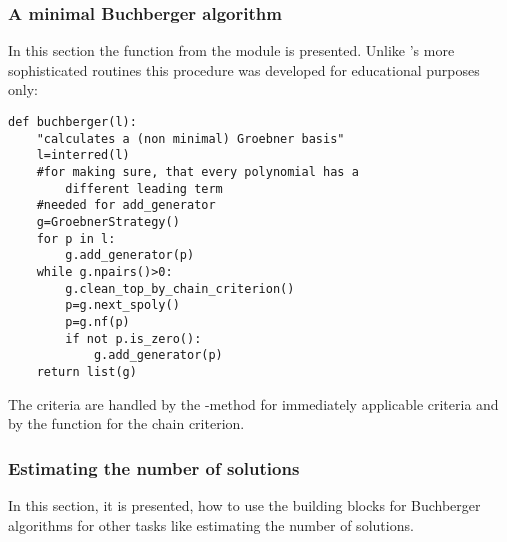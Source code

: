 \subsubsection{A minimal Buchberger algorithm}
In this section   the  function from the module
 is presented. Unlike \PolyBoRi's more sophisticated
routines this procedure was developed for educational purposes only:
\begin{lstlisting}
def buchberger(l):
    "calculates a (non minimal) Groebner basis"
    l=interred(l)
    #for making sure, that every polynomial has a 
        different leading term
    #needed for add_generator
    g=GroebnerStrategy()
    for p in l:
        g.add_generator(p)
    while g.npairs()>0:
        g.clean_top_by_chain_criterion()
        p=g.next_spoly()
        p=g.nf(p)
        if not p.is_zero():
            g.add_generator(p)
    return list(g)
\end{lstlisting}
The criteria are handled by the -method for
immediately applicable criteria and by the function  for the chain criterion.


\subsubsection{Estimating the number of solutions}
In this section, it is presented, how to use the building blocks for Buchberger algorithms for other tasks like estimating the number of solutions.

